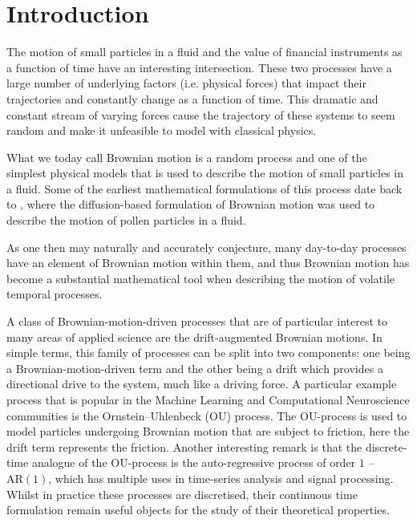 \documentclass[a4paper,12pt,twoside,openright]{report}
\theoremstyle{definition}
\begin{document}
\pagestyle{empty}
\singlespacing

\onehalfspacing

\singlespacing


\setcounter{page}{0}
\pagestyle{plain}
\tableofcontents
\listoffigures
\listoftables

\onehalfspacing


 \chapter{Introduction}
 
 The motion of small particles in a fluid and the value of financial instruments as a function of time have an interesting intersection. These two processes have a large number of underlying factors (i.e. physical forces) that impact their trajectories and constantly change as a function of time. This dramatic and constant stream of varying forces cause the trajectory of these systems to seem random and make it unfeasible to model with classical physics. 
 
 What we today call Brownian motion is a random process and one of the simplest physical models that is used to describe the motion of small particles in a fluid. Some of the earliest mathematical formulations of this process date back to \cite{einstein1905motion}, where the diffusion-based formulation of Brownian motion was used to describe the motion of pollen particles in a fluid.
 
 As one then may naturally and accurately conjecture, many day-to-day processes have an element of Brownian motion within them, and thus Brownian motion has become a substantial mathematical tool when describing the motion of volatile temporal processes.
 
 A class of Brownian-motion-driven processes that are of particular interest to many areas of applied science are the drift-augmented Brownian motions. In simple terms, this family of processes can be split into two components: one being a Brownian-motion-driven term and the other being a drift which provides a directional drive to the system, much like a driving force.  A particular example process that is popular in the Machine Learning and Computational Neuroscience communities is the Ornstein–Uhlenbeck (OU) process. The OU-process is used to model particles undergoing Brownian motion that are subject to friction, here the drift term represents the friction. Another interesting remark is that the discrete-time analogue of the OU-process is the auto-regressive process of order $1$ -- $\text{AR}(1)$, which has multiple uses in time-series analysis and signal processing. Whilst in practice these processes are discretised, their continuous time formulation remain useful objects for the study of their theoretical properties.
 
\end{document}
